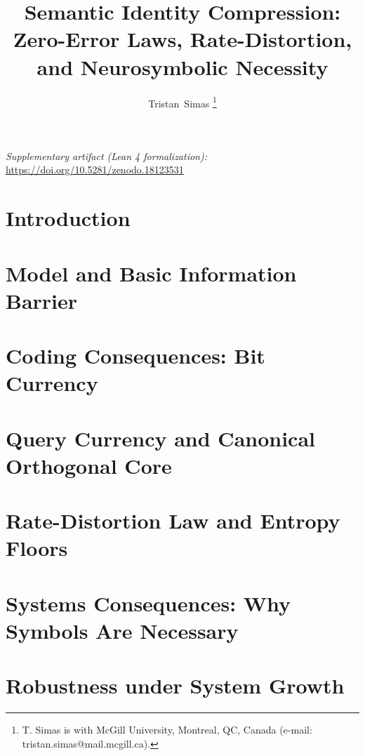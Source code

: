 \documentclass[12pt, onecolumn]{IEEEtran}
\title{Semantic Identity Compression: Zero-Error Laws, Rate-Distortion, and Neurosymbolic Necessity}
\author{Tristan~Simas%
\thanks{T. Simas is with McGill University, Montreal, QC, Canada (e-mail: tristan.simas@mail.mcgill.ca).}}
\begin{document}
\ifdefined\JSAITREVIEW\doublespacing\fi

\maketitle


\ifdefined\JSAITREVIEW
\noindent\textit{Supplementary artifact (Lean 4 formalization):} \url{https://doi.org/10.5281/zenodo.18123531}
\par\medskip
\fi

\section{Introduction}


\section{Model and Basic Information Barrier}\label{sec:model}\label{sec:framework}


\section{Coding Consequences: Bit Currency}\label{sec:bits}



\section{Query Currency and Canonical Orthogonal Core}\label{sec:queries}


\section{Rate-Distortion Law and Entropy Floors}\label{sec:distortion}


\section{Systems Consequences: Why Symbols Are Necessary}\label{sec:systems}\label{sec:applications}\label{sec:complexity}


\section{Robustness under System Growth}\label{sec:robustness}

\end{document}
